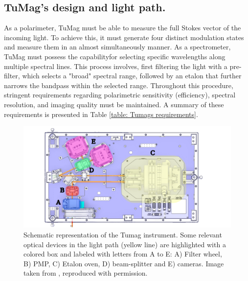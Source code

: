 \subsection{TuMag's design and light path.}

As a polarimeter, TuMag must be able to measure the full Stokes vector of the incoming light. To achieve this, it must generate four distinct modulation states and measure them in an almost simultaneously manner. As a spectrometer, TuMag must possess the capabilityfor selecting specific wavelengths along multiple spectral lines. This process involves, first filtering the light with a pre-filter, which selects a "broad" spectral range, followed by an etalon that further narrows the bandpass within the selected range. Throughout this procedure, stringent requirements regarding polarimetric sensitivity (efficiency), spectral resolution, and imaging quality must be maintained. A summary of these requirements is presented in Table \ref{table: Tumags requirements}.

\begin{figure}[t]
    \includegraphics[width=\textwidth]{figures/TuMag/Scheme.pdf}
    \caption[Tumag schematic.]{Schematic representation of the Tumag instrument. Some relevant optical devices in the light path (yellow line) are highlighted with a colored box and labeled with letters from A to E: A) Filter wheel, B) PMP, C) Etalon oven, D) beam-splitter and E) cameras. Image taken from \cite{tumag}, reproduced with permission.      
    \label{fig_tumag:scheme}}
\end{figure}


